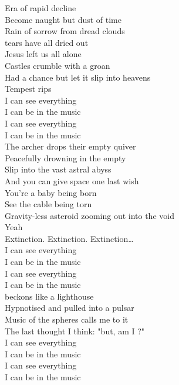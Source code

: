 Era of rapid decline \\
Become naught but dust of time \\
Rain of sorrow from dread clouds \\
 tears have all dried out \\
Jesus left us all alone \\
Castles crumble with a groan \\
Had a chance but let it slip into heavens \\
Tempest rips \\

I can see everything \\
I can be in the music \\
I can see everything \\
I can be in the music \\

The archer drops their empty quiver \\
Peacefully drowning in the empty  \\
Slip into the vast astral abyss \\
And you can give space one last wish \\

You're a baby being born \\
See the cable being torn \\
Gravity-less asteroid zooming out into the void \\
Yeah \\

Extinction. Extinction. Extinction… \\

I can see everything \\
I can be in the music \\
I can see everything \\
I can be in the music \\

 beckons like a lighthouse \\
Hypnotised and pulled into a pulsar \\
Music of the spheres calls me to it \\
The last thought I think: "but, am I ?" \\

I can see everything \\
I can be in the music \\
I can see everything \\
I can be in the music \\

